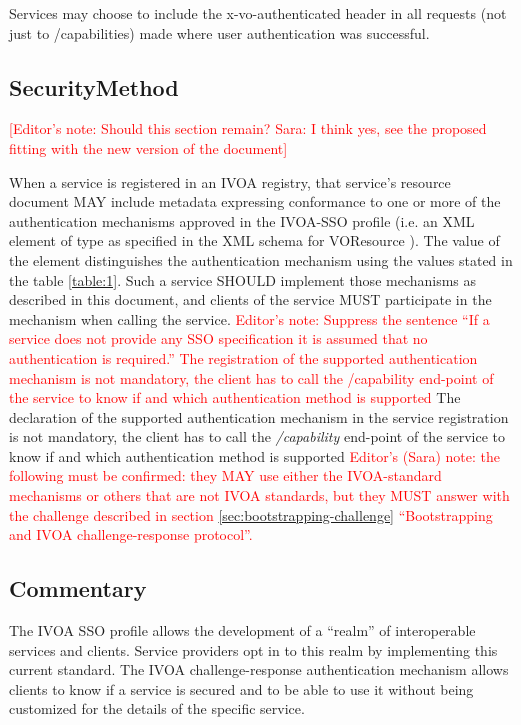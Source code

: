 \documentclass[11pt,a4paper]{ivoa}
\begin{document}
Services may choose to include the x-vo-authenticated header in all
requests (not just to /capabilities) made where user authentication was
successful.

\subsection{SecurityMethod}

\textcolor{red}{[Editor's note: Should this section remain? Sara: I
think yes, see the proposed fitting with the new version of the
document]}

When a service is registered in an IVOA registry, that service's
resource document MAY include metadata expressing conformance to one or
more of the authentication mechanisms approved in the IVOA-SSO profile
(i.e. an XML element
of type  as specified in the XML schema for
VOResource \citep{2018ivoa.spec.0625P}).
The value of the element 
distinguishes the authentication mechanism using the values stated in
the table  \ref{table:1}.
Such a service SHOULD implement those mechanisms as described in this
document, and clients of the service MUST participate in the mechanism
when calling the service.
\textcolor{red}{Editor's note: Suppress the sentence ``If a service does
not provide any SSO specification it is assumed that no authentication
is required.'' The registration of the supported authentication
mechanism is not mandatory, the client has to call the /capability
end-point of the service to know if and which authentication method is
supported} The declaration of the supported authentication mechanism in
the service registration is not mandatory, the client has to call the
\emph{/capability} end-point
of the service to know if and which authentication method is supported
\textcolor{red}{Editor's (Sara) note: the following must be confirmed:
they MAY use either the IVOA-standard mechanisms or
others that are not IVOA standards, but they MUST answer with the
challenge described in section \ref{sec:bootstrapping-challenge}
``Bootstrapping and IVOA challenge-response protocol''.}

\subsection{Commentary}
The IVOA SSO profile allows the development of a ``realm'' of
interoperable services and clients.
Service providers opt in to this realm by implementing this current
standard.
The IVOA challenge-response authentication mechanism allows clients to
know if a service is secured and to be able to use it without
being customized for the details of the specific service.
\end{document}
